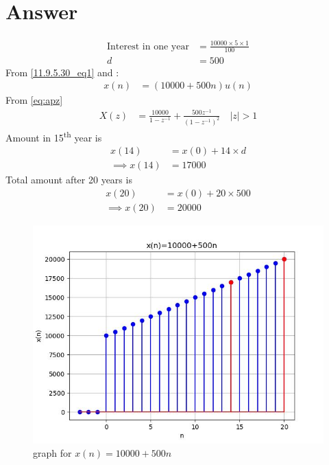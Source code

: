 \documentclass[journal,12pt,twocolumn]{IEEEtran}
\theoremstyle{remark}
\begin{document}
\section*{Answer}
\fi

\begin{align}
\text{Interest in one year} &= \frac{10000\times5\times1}{100}\\    
    d &= 500\label{11.9.5.30_eq1}
\end{align}
From \eqref{11.9.5.30_eq1} and :
    \begin{align}
        x(n) &= (10000 + 500n)u(n)
    \end{align}
From \eqref{eq:apz}
    \begin{align}
        X(z) &= \frac{10000}{1-z^{-1}} + \frac{500z^{-1}}{(1-z^{-1})^2} \quad |z|>1
    \end{align}
Amount in 15\textsuperscript{th} year is
    \begin{align}
        x(14) &= x(0) + 14\times d\\
        \implies x(14) &= 17000
    \end{align}
Total amount after 20 years is
    \begin{align}
        x(20) &= x(0) + 20\times 500\\
        \implies x(20) &= 20000
    \end{align}
    \begin{figure}[h]
    \renewcommand\thefigure{1}
        \centering
        \includegraphics[width=1\linewidth]{ncert-maths/11/9/5/30/figs/p.jpeg}
        \caption{graph for $x(n) = 10000 + 500n$}
        \label{graph}
    \end{figure}

\end{document}
